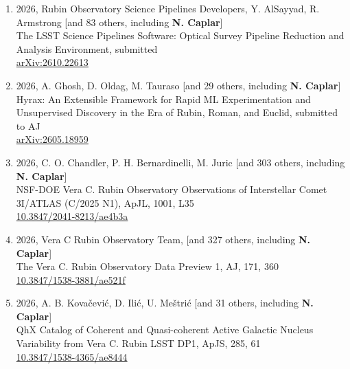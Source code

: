 \documentclass[11pt,letterpaper]{article}
\begin{document}
\begin{enumerate}

\item 2026, Rubin Observatory Science Pipelines Developers, Y. AlSayyad, R. Armstrong [and 83 others, including \textbf{N. Caplar}] \\
The LSST Science Pipelines Software: Optical Survey Pipeline Reduction and Analysis Environment, submitted \\
\href{https://ui.adsabs.harvard.edu/link_gateway/2026arXiv261022613O/arxiv:2610.22613}{arXiv:2610.22613} \\

\item 2026, A. Ghosh, D. Oldag, M. Tauraso [and 29 others, including \textbf{N. Caplar}] \\
Hyrax: An Extensible Framework for Rapid ML Experimentation and Unsupervised Discovery in the Era of Rubin, Roman, and Euclid, submitted to AJ \\
\href{https://ui.adsabs.harvard.edu/link_gateway/2026arXiv260518959G/arxiv:2605.18959}{arXiv:2605.18959} \\


\item 2026, C. O. Chandler, P. H. Bernardinelli, M. Juric [and 303 others, including \textbf{N. Caplar}] \\
NSF-DOE Vera C. Rubin Observatory Observations of Interstellar Comet 3I/ATLAS (C/2025 N1), ApJL, 1001, L35 \\
\href{https://ui.adsabs.harvard.edu/link_gateway/2026ApJ..1001L..35C/doi:10.3847/2041-8213/ae4b3a}{10.3847/2041-8213/ae4b3a } \\

\item 2026, Vera C Rubin Observatory Team, [and 327 others, including \textbf{N. Caplar}] \\
The Vera C. Rubin Observatory Data Preview 1, AJ, 171, 360 \\
\href{https://ui.adsabs.harvard.edu/link_gateway/2026AJ....171..360V/doi:10.3847/1538-3881/ae521f}{10.3847/1538-3881/ae521f} \\

\item 2026, A. B. Kova\v{c}evi\'{c}, D. Ili\'{c}, U. Me\v{s}tri\'{c} [and 31 others, including \textbf{N. Caplar}] \\
QhX Catalog of Coherent and Quasi-coherent Active Galactic Nucleus Variability from Vera C. Rubin LSST DP1, ApJS, 285, 61 \\
\href{https://ui.adsabs.harvard.edu/link_gateway/2026ApJS..285...61K/doi:10.3847/1538-4365/ae8444}{10.3847/1538-4365/ae8444} \\


\end{enumerate}
\end{document}
